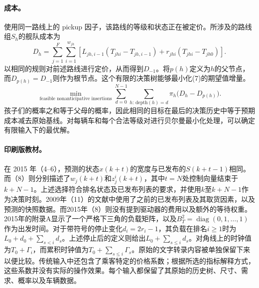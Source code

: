 \documentclass{article}
\begin{document}
\paragraph{成本。}
使用同一路线上的 pickup 因子，该路线的等级和状态正在被定价。所涉及的路线组$S_h$的舰队成本为
\[
 D_h=\sum_{j=1}^{F}\sum_{i=1}^{w_{jh}}
 \left[L_{jh,i-1}\left(T_{jhi}-T_{jh,i-1}\right)
       +r_{jhi}\left(T_{jhi}-T_{jh0}\right)\right].
\]
以相同的规则对前述路线进行定价，从而得到$D_{-1}$。将$p(h)$定义为$h$的父节点，而$D_{p(h)}=D_{-1}$则作为根节点。这个有限的决策树能够最小化(7)的期望值增量。
\[
 \min_{\text{feasible nonanticipative insertions}}
       \sum_{d=0}^{N-1}\sum_{h:\,\mathrm{depth}(h)=d}\pi_h\big(D_h-D_{p(h)}\big).
\]
孩子们的概率之和等于父母的概率，因此相同的目标在最后的决策历史中等于预期成本减去原始基线。对每辆车和每个合法等级对进行贝尔曼最小化处理，可以确定有限输入下的最优解。

\paragraph{印刷版教材。}
在 2015 年（4–6），预测的状态$x(k+t)$的宽度与已发布的$S(k+t-1)$相同。而（8）则分别描述了$w_j(k+t)$和$z_j^i(k+t)$，其中$t=N$处控制向量结束于$k+N-1$。上述选择符合排名状态及已发布列表的要求，并使用$k$至$k+N-1$作为决策时刻。2009年（11）的文献中使用了之前的已发布列表及其取货因素，以及预测的快照数据。而2015年（8）则没有提到驱动器的费用以及额外的等待权重。2015年的附录A显示了一个严格下三角的负载矩阵，以及$B_T^2=\operatorname{diag}(0,1,\ldots,1)$作为出发时间。对于带符号的停止变化$d_i=2r_i-1$，其负载在排名$i\geq1$时为$L_0+d_0+\sum_{s<i}d_s$。上述停止后的定义则给出$L_0+\sum_{s\leq i}d_s$。对角线上的时钟值为$T_0+\Gamma_i$，而累积时钟值为$T_0+\sum_{s\leq i}\Gamma_s$。原始的文字转录内容被单独保留下来以便比较。传统输入中还包含了乘客特定的价格系数；根据所选的指标解释方式，这些系数并没有实际的操作效果。每个输入都保留了其原始的历史树、尺寸、需求、概率以及车辆数据。
\end{document}
